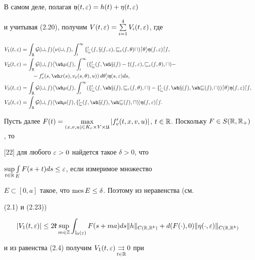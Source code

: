 В самом деле, полагая $\frak y(t,\varepsilon)= h(t)+\eta(t,\varepsilon)$


и учитывая (2.20), получим $V(t,\varepsilon)=\sum\limits_{i=1}^{4} V_i(t,\varepsilon)$, где


\begin{align*}


V_1(t,\ve)&= \int_{\R} \pG(t,s) \big\la \nu(t,s),


\int_{0}^{1} f_v'(s,x(s,\ve), v_{\ve}(s,\ta)u)d\ta \big\ra


\frak y(s,\ve)ds, \\


V_2(t,\ve)&= \int_{\R} \pG(t,s) \big\la \wh\mu(s),


\int_{0}^{1} (f_v'(s,\wh x(s)-z(s,\ve), v_{\ve}(s,\ta),u)- \\


&\qquad-f_v'(s,\wh x(s),v_{\ve}(s,\ta),u))\,d\ta\big\ra\frak y(s,\ve)ds, \\


V_3(t,\ve)&= \int_{\R} \pG(t,s)


\big\la \wh\mu(s), \int_{0}^{1}


(f_v'(s,\wh x(s), v_{\ve}(s,\ta),u)-


f_{v}'(s,\wh x(s),\wh v(s),u))d\ta \big\ra \frak y(s,\ve)ds, \\


V_4(t,\ve)&= \int_{\R} \pG(t,s)


\la \wh\mu(s), f_v'(s,\wh x(s), \wh v(s),u) \ra \frak y(s,\ve)ds.


\end{align*}


Пусть далее $F(t)=\max\lt_{(x,v,u)\in K_{r}\times V\times\gU}


|f'_{v}(t,x,v,u)|$, $t\in\R$. Поскольку $F\in S(\R,\R_{+})$, то


[22] для любого $\varepsilon>0$ найдется такое $\delta>0$, что


$\sup\limits_{t\in\Bbb R}\int\limits_{E}F(s+t)ds\le\varepsilon$, если измеримое множество


$E\subset[0,a]$ такое, что $\operatorname{mes} E\le\delta$. Поэтому из неравенства (см.


(2.1) и (2.23))


$$


|V_{1}(t,\ve)|\le2\gk\sup_{m\in\Bbb Z}\int_{\Bbb I_{0}(\ve)}


F(s+ma)ds\|h\|_{C(\R,\R^k)}


+d(F(\cdot),0)\|\eta(\cdot,\ve)\|_{C(\R,\R^k)}


$$


и из равенства (2.4) получим $V_{1}(t,\varepsilon)\mathop{\rightrightarrows}\limits_{t\in\Bbb R}0$ при


